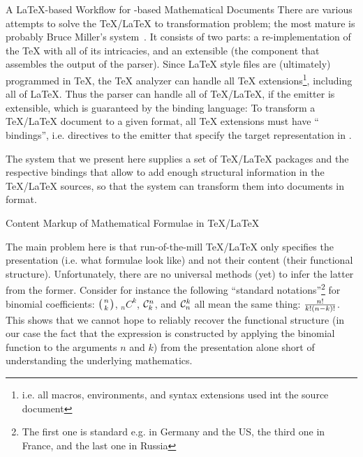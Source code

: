 \begin{omgroup}[id=stex,creators=miko]
\begin{omgroup}{A {\LaTeX}-based Workflow for {\xml}-based Mathematical Documents}
  There are various attempts to solve the {\TeX/\LaTeX} to {\xml} transformation problem;
  the most mature is probably Bruce Miller's {\latexml} system~\cite{Miller:latexml}. It
  consists of two parts: a re-implementation of the {\TeX} {} with all
  of its intricacies, and an extensible {\xml} {} (the component that
  assembles the output of the parser). Since {\LaTeX} style files are (ultimately)
  programmed in {\TeX}, the {\TeX} analyzer can handle all {\TeX}
  extensions\footnote{i.e. all macros, environments, and syntax extensions used int the
    source document}, including all of {\LaTeX}. Thus the {\latexml} parser can handle all
  of {\TeX/\LaTeX}, if the emitter is extensible, which is guaranteed by the {\latexml}
  binding language: To transform a {\TeX/\LaTeX} document to a given {\xml} format, all
  {\TeX} extensions must have ``{\latexml} bindings'',
  i.e. directives to the {\latexml} emitter that specify the target representation in
  {\xml}.

  The {\stex} system that we present here supplies a set of {\TeX/\LaTeX} packages and the
  respective {\latexml} bindings that allow to add enough structural information in the
  {\TeX/\LaTeX} sources, so that the {\latexml} system can transform them into documents
  in {\omdoc} format.
\end{omgroup}

\begin{module}[id=content-markup-LaTeX]
\begin{omgroup}{Content Markup of Mathematical Formulae in {\TeX/\LaTeX}}

  The main problem here is that run-of-the-mill {\TeX/\LaTeX} only specifies the
  presentation (i.e. what formulae look like) and not their content (their functional
  structure). Unfortunately, there are no universal methods (yet) to infer the latter from
  the former.  Consider for instance the following ``standard notations''\footnote{The
    first one is standard e.g. in Germany and the US, the third one in France, and the
    last one in Russia} for binomial coefficients: $\left(n\atop k\right)$, $_nC^k$,
  ${\cal C}^n_k$, and ${\cal C}^k_n$ all mean the same thing: $n!\over k!(n-k)!$. This
  shows that we cannot hope to reliably recover the functional structure (in our case the
  fact that the expression is constructed by applying the binomial function to the
  arguments $n$ and $k$) from the presentation alone short of understanding the underlying
  mathematics.
 

\end{omgroup}
\end{module}
\end{omgroup}
